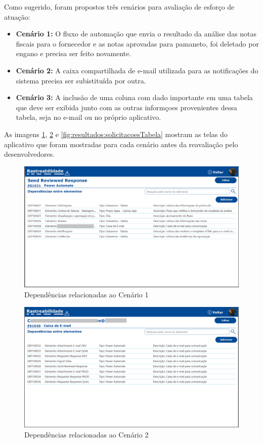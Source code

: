 	Como sugerido, foram propostos três cenários para avaliação de esforço de atuação:

	\begin{itemize}
		\item \textbf{Cenário 1:} O fluxo de automação que envia o resultado da análise das notas fiscais para o fornecedor e as notas aprovadas para pamaneto,
		foi deletado por engano e precisa ser feito novamente.
		\item \textbf{Cenário 2:} A caixa compartilhada de e-mail utilizada para as notificações do sistema precisa ser subistituída por outra.
		\item \textbf{Cenário 3:} A inclusão de uma coluna com dado importante em uma tabela que deve ser exibida junto com as outras informçoes provenientes dessa tabela, seja no e-mail ou no próprio aplicativo.
	\end{itemize}

	As imagens \ref{fig:resultados:sendReviewedResponse}, \ref{fig:resultados:caixadeEmail} e \ref{fig:resultados:solicitacoesTabela} mostram as telas do aplicativo
	que foram mostradas para cada cenário antes da reavaliação pelo desenvolvedores.

	\begin{figure}[!h]
		\centering
		\includegraphics[width=1\textwidth]{./figuras/sendReviewedResponse.png}
		\caption{Dependências relacionadas ao Cenário 1}
		\label{fig:resultados:sendReviewedResponse}
	\end{figure}

	\begin{figure}[!h]
		\centering
		\includegraphics[width=1\textwidth]{./figuras/caixadeEmail.png}
		\caption{Dependências relacionadas ao Cenário 2}
		\label{fig:resultados:caixadeEmail}
	\end{figure}

